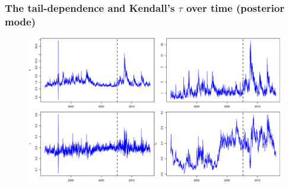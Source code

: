 \documentclass{beamer}
\begin{document}
\begin{frame}
  \frametitle{The tail-dependence and Kendall's $\tau$ over time (posterior mode)}
  \begin{figure}
    \centering
    \includegraphics[height=0.34\textheight]{var-post}\\
    \includegraphics[height=0.35\textheight]{tau-post}
  \end{figure}
\end{frame}


\end{document}
